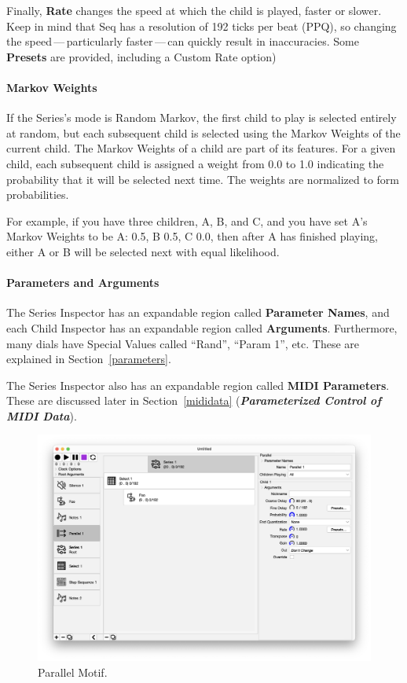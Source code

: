 \documentclass[twoside,10pt]{article}
\begin{document}
Finally, {\bf Rate} changes the speed at which the child is played, faster or slower.  Keep in mind that Seq has a resolution of 192 ticks per beat (PPQ), so changing the speed\,---\,particularly faster\,---\,can quickly result in inaccuracies.  Some {\bf Presets} are provided, including a Custom Rate option)

\paragraph{Markov Weights}

If the Series's mode is Random Markov, the first child to play is selected entirely at random, but each subsequent child is selected using the Markov Weights of the current child.  The Markov Weights of a child are part of its features.  For a given child, each subsequent child is assigned a weight from 0.0 to 1.0 indicating the probability that it will be selected next time.  The weights are normalized to form probabilities.

For example, if you have three children, A, B, and C, and you have set A's Markov Weights to be A: 0.5, B 0.5, C 0.0, then after A has finished playing, either A or B will be selected next with equal likelihood.

\paragraph{Parameters and Arguments}

The Series Inspector has an expandable region called {\bf Parameter Names}, and each Child Inspector has an expandable region called {\bf Arguments}. Furthermore, many dials have Special Values called ``Rand'', ``Param 1'', etc.  These are explained in Section~\ref{parameters}.

The Series Inspector also has an expandable region called {\bf MIDI Parameters}.  These are discussed later in Section~\ref{mididata} (\textbf{\textit{Parameterized Control of MIDI Data}}).

\clearpage

\begin{figure}[t]
\centering
\includegraphics[width=6.5in]{Parallel}
\vspace{-2em}
\caption{Parallel Motif.}
\label{parallel}
\end{figure}
\end{document}
